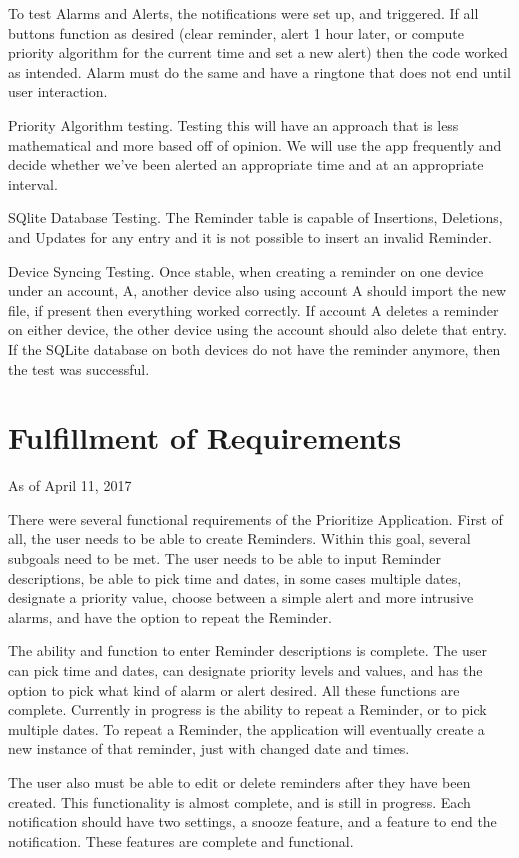 \documentclass[12pt]{article}
\begin{document}
To test Alarms and Alerts, the notifications were set up, and triggered. If all buttons function as desired (clear reminder,  alert 1 hour later, or compute priority algorithm for the current time and set a new alert) then the code worked as intended. Alarm must do the same and have a ringtone that does not end until user interaction.

Priority Algorithm testing. Testing this will have an approach that is less mathematical and more based off of opinion. We will use the app frequently and decide whether we've been alerted an appropriate time and at an appropriate interval. 

SQlite Database Testing. The Reminder table is capable of Insertions, Deletions, and Updates for any entry and it is not possible to insert an invalid Reminder.

Device Syncing Testing. Once stable, when creating a reminder on one device under an account, A, another device also using account A should import the new file, if present then everything worked correctly. If account A deletes a reminder on either device, the other device using the account should also delete that entry. If the SQLite database on both devices do not have the reminder anymore, then the test was successful.


\section{Fulfillment of Requirements}
As of April 11, 2017

There were several functional requirements of the Prioritize Application. First of all, the user needs to be able to create Reminders. Within this goal, several subgoals need to be met. The user needs to be able to input Reminder descriptions, be able to pick time and dates, in some cases multiple dates, designate a priority value, choose between a simple alert and more intrusive alarms, and have the option to repeat the Reminder. 

The ability and function to enter Reminder descriptions is complete. The user can pick time and dates, can designate priority levels and values, and has the option to pick what kind of alarm or alert desired. All these functions are complete. 
Currently in progress is the ability to repeat a Reminder, or to pick multiple dates. To repeat a Reminder, the application will eventually create a new instance of that reminder, just with changed date and times.  

The user also must be able to edit or delete reminders after they have been created. This functionality is almost complete, and is still in progress. 
Each notification should have two settings, a snooze feature, and a feature to end the notification. These features are complete and functional.
\end{document}
